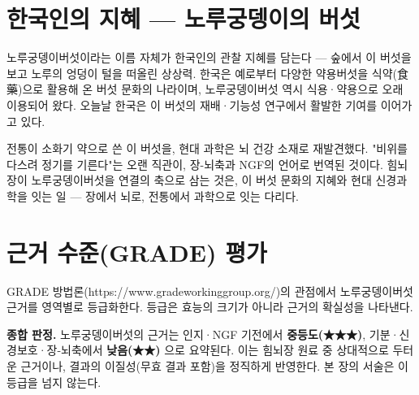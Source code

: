 \documentclass[11pt,oneside]{book}
\begin{document}
\section{한국인의 지혜 — 노루궁뎅이의 버섯}
노루궁뎅이버섯이라는 이름 자체가 한국인의 관찰 지혜를 담는다 — 숲에서 이 버섯을 보고 노루의 엉덩이 털을 떠올린 상상력. 한국은 예로부터 다양한 약용버섯을 식약(食藥)으로 활용해 온 버섯 문화의 나라이며, 노루궁뎅이버섯 역시 식용·약용으로 오래 이용되어 왔다. 오늘날 한국은 이 버섯의 재배·기능성 연구에서 활발한 기여를 이어가고 있다.

전통이 소화기 약으로 쓴 이 버섯을, 현대 과학은 뇌 건강 소재로 재발견했다. "비위를 다스려 정기를 기른다"는 오랜 직관이, 장-뇌축과 NGF의 언어로 번역된 것이다. 힘뇌장이 노루궁뎅이버섯을 연결의 축으로 삼는 것은, 이 버섯 문화의 지혜와 현대 신경과학을 잇는 일 — 장에서 뇌로, 전통에서 과학으로 잇는 다리다.

\section{근거 수준(GRADE) 평가}
GRADE 방법론(https://www.gradeworkinggroup.org/)의 관점에서 노루궁뎅이버섯 근거를 영역별로 등급화한다. 등급은 효능의 크기가 아니라 근거의 확실성을 나타낸다.

\vspace{2pt}\vspace{3pt}

\textbf{종합 판정.} 노루궁뎅이버섯의 근거는 인지·NGF 기전에서 \textbf{중등도(★★★)}, 기분·신경보호·장-뇌축에서 \textbf{낮음(★★)} 으로 요약된다. 이는 힘뇌장 원료 중 상대적으로 두터운 근거이나, 결과의 이질성(무효 결과 포함)을 정직하게 반영한다. 본 장의 서술은 이 등급을 넘지 않는다.
\end{document}
